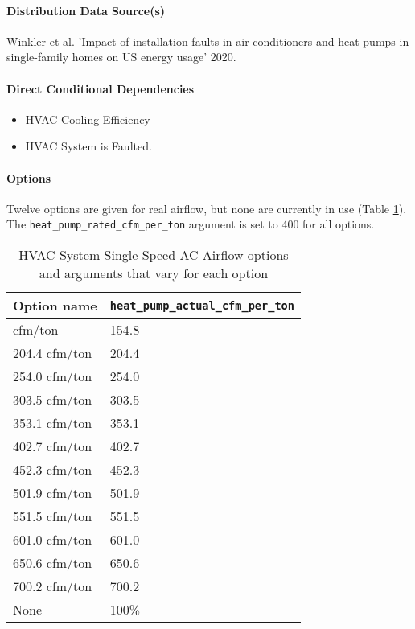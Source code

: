 \paragraph{Distribution Data Source(s)}
Winkler et al. 'Impact of installation faults in air conditioners and heat pumps in single-family homes on US energy usage' 2020.

\paragraph{Direct Conditional Dependencies}
\begin{itemize}
    \item HVAC Cooling Efficiency
    \item HVAC System is Faulted.
\end{itemize}

\paragraph{Options}
Twelve options are given for real airflow, but none are currently in use (Table \ref{table:hc_opt_hvac_ss_ac_airflow}). The \texttt{heat\_pump\_rated\_cfm\_per\_ton} argument is set to 400 for all options.

\begin{longtable}[]{|p{3.5cm}|p{6cm}|}\caption{HVAC System Single-Speed AC Airflow options and arguments that vary for each option} \label{table:hc_opt_hvac_ss_ac_airflow} \\
\toprule\noalign{}
Option name &

\texttt{heat\_pump\_actual\_cfm\_per\_ton} \\
\midrule\noalign{}
\endhead
\bottomrule\noalign{}
\endlastfoot
154.8 cfm/ton & 154.8 \\
204.4 cfm/ton & 204.4 \\
254.0 cfm/ton & 254.0 \\
303.5 cfm/ton & 303.5 \\
353.1 cfm/ton & 353.1 \\
402.7 cfm/ton & 402.7 \\
452.3 cfm/ton & 452.3 \\
501.9 cfm/ton & 501.9 \\
551.5 cfm/ton & 551.5 \\
601.0 cfm/ton & 601.0 \\
650.6 cfm/ton & 650.6 \\
700.2 cfm/ton & 700.2 \\
None & 100\% \\
\end{longtable}

